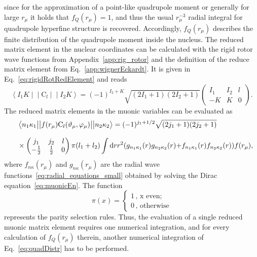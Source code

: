 since for the approximation of a point-like quadrupole moment or generally for large $r_\mu$ it holds that $f_Q(r_\mu)=1$, and thus the usual $r_\mu^{-3}$ radial integral for quadrupole hyperfine structure is recovered. Accordingly, $f_Q(r_\mu)$ describes the finite distribution of the quadrupole moment inside the nucleus. The reduced matrix element in the nuclear coordinates can be calculated with the rigid rotor wave functions from Appendix~\ref{app:rig_rotor} and the definition of the reduce matrix element from Eq.~\eqref{app:wignerEckardt}. It is given in Eq.~\eqref{eq:rigidRotRedElement} and reads
\begin{equation}
\left< I_1K\middle|\middle|\text{C}_l\middle|\middle|I_2K\right>=(-1)^{I_2+K}
\sqrt{(2I_1+1)(2I_2+1)}
\left(
\begin{matrix}
I_1&I_2&l\\
-K&K&0
\end{matrix}
\right).
\end{equation}
The reduced matrix elements in the muonic variables can be evaluated as~\cite{johnson2007}
\begin{alignat}{2}
&&&\left< n_1\kappa_1\big{|}\big{|}f(r_\mu)\text{C}_l(\vartheta_\mu,\varphi_\mu) \big{|}\big{|}n_2\kappa_2\right> =
 (-1)^{j_1+1/2} \sqrt{(2j_1+1)(2j_2+1)}
\notag\\[7.5pt]
&&&\times
\left(
\begin{matrix}
j_1&j_2&l\\
-\frac{1}{2}&\frac{1}{2}&0
\end{matrix}
\right)\pi(l_1+l_2)\int \text{d}rr^2 ({g_{n_1\kappa_1}(r)g_{n_2\kappa_2}(r)}{+}{f_{n_1\kappa_1}(r)f_{n_2\kappa_2}(r)}) f(r_\mu),
\end{alignat}
where $f_{n\kappa}(r_\mu)$ and $g_{n\kappa}(r_\mu)$ are the radial wave functions~\eqref{eq:radial_equations_small} obtained by solving the Dirac equation~\eqref{eq:muonicEn}.
The function
\begin{equation}
\label{eq:parityFunc}
\pi(x) =
\left\{
\begin{matrix}
1\,\text{, x even;}\phantom{11}\\
0\,\text{, otherwise}
\end{matrix}
\right.
\end{equation}
represents the parity selection rules.
Thus, the evaluation of a single reduced muonic matrix element requires one numerical integration, and for every calculation of $f_Q(r_\mu)$ therein, another numerical integration of Eq.~\eqref{eq:quadDistr} has to be performed.

